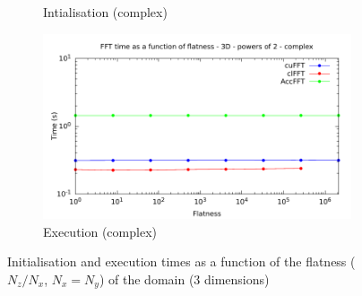 \documentclass[12pt, a4paper]{article}
\begin{document}
\begin{figure}[H]
\begin{subfigure}{.5\textwidth}
\caption{Intialisation (complex)}
\label{FFT1DCI}
\end{subfigure}%
\begin{subfigure}{.5\textwidth}
\centering
\includegraphics[width=.9\linewidth]{graphs/flatness-c-exec.pdf}
\caption{Execution (complex)}
\label{FFT1DCE}
\end{subfigure}
\caption{Initialisation and execution times as a function of the flatness ($N_z/N_x$, $N_x=N_y$) of the domain (3 dimensions)}
\label{FLATNESSGRAPH}
\end{figure}
\end{document}
